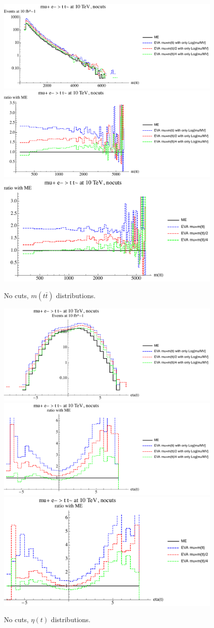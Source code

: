 \documentclass[a4paper,11pt]{article}
\begin{document}
 
 \begin{figure}[!t]
\includegraphics[width=0.46\linewidth]{Notebooks/PlotDistr/WW_tt/10TeVnocuts/plotmtt.pdf}
\includegraphics[width=0.46\linewidth]{Notebooks/PlotDistr/WW_tt/10TeVnocuts/plotmttratio1.pdf}
\includegraphics[width=0.46\linewidth]{Notebooks/PlotDistr/WW_tt/10TeVnocuts/plotmttratio2.pdf}
\caption{No cuts, $m(t \bar t)$ distributions. \label{fig:nocutsWWtt}}
\end{figure}



\begin{figure}[!t]
\includegraphics[width=0.46\linewidth]{Notebooks/PlotDistr/WW_tt/10TeVnocuts/plotetat.pdf}
\includegraphics[width=0.46\linewidth]{Notebooks/PlotDistr/WW_tt/10TeVnocuts/plotetatratio1.pdf}
\includegraphics[width=0.46\linewidth]{Notebooks/PlotDistr/WW_tt/10TeVnocuts/plotetatratio2.pdf}
\caption{No cuts, $\eta(t)$ distributions. \label{fig:nocutsWWtt2}}
\end{figure}
\end{document}
